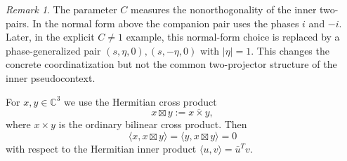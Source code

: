 \documentclass[
  twocolumn,
  aps,
  pra,
  floatfix,
  amsmath,amssymb,
  longbibliography
]{revtex4-2}
\theoremstyle{definition}
\theoremstyle{remark}
\newtheorem{remark}[theorem]{Remark}
\begin{document}
\begin{remark}
The parameter \(C\) measures the nonorthogonality of the inner two-pairs.
In the normal form above the companion pair uses the phases \(i\) and
\(-i\).  Later, in the explicit \(C\neq1\) example, this normal-form
choice is replaced by a phase-generalized pair
\((s,\eta,0),(s,-\eta,0)\) with \(|\eta|=1\).  This changes the concrete
coordinatization but not the common two-projector structure of the inner
pseudocontext.
\end{remark}

For \(x,y\in\mathbb C^3\) we use the Hermitian cross product
\[
x\boxtimes y:=\overline{x\times y},
\]
where \(x\times y\) is the ordinary bilinear cross product. Then
\[
\langle x,x\boxtimes y\rangle=\langle y,x\boxtimes y\rangle=0
\]
with respect to the Hermitian inner product \(\langle u,v\rangle=\bar u^T v\).
\end{document}
